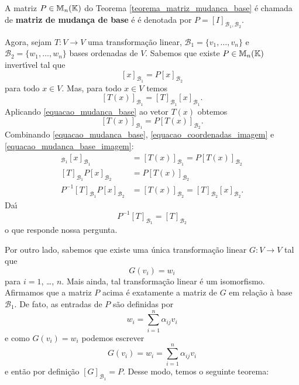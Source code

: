 \begin{definicao}
	A matriz $P \in \mathbb{M}_n(\mathbb{K})$ do Teorema \ref{teorema_matriz_mudanca_base} \'e chamada de \textbf{matriz de mudan\c{c}a de base} \'e \'e denotada por $P = [I]_{{\mathcal{B}_1},{\mathcal{B}_2}}$.
\end{definicao}

Agora, sejam $T : V \to V$ uma transforma\c{c}\~ao linear, $\mathcal{B}_1 = \{v_1,\dots,v_n\}$ e $\mathcal{B}_2 = \{w_1,\dots,w_n\}$ bases ordenadas de $V$. Sabemos que existe $P \in \mathbb{M}_n(\mathbb{K})$ invert{\'\i}vel tal que
\begin{equation}\label{equacao_mudanca_base}
	[x]_{\mathcal{B}_1} = P[x]_{\mathcal{B}_2}
\end{equation}
para todo $x \in V$. Mas, para todo $x \in V$ temos
\begin{equation}\label{equacao_coordenadas_imagem}
	[T(x)]_{\mathcal{B}_1} = [T]_{\mathcal{B}_1}[x]_{\mathcal{B}_1}.
\end{equation}
Aplicando \eqref{equacao_mudanca_base} ao vetor $T(x)$ obtemos
\begin{equation}\label{equacao_mudanca_base_imagem}
	[T(x)]_{\mathcal{B}_1} = P[T(x)]_{\mathcal{B}_2}.
\end{equation}
Combinando \eqref{equacao_mudanca_base}, \eqref{equacao_coordenadas_imagem} e \eqref{equacao_mudanca_base_imagem}:
\begin{align*}
	[T]_{\mathcal{B}_1}[x]_{\mathcal{B}_1} &= [T(x)]_{\mathcal{B}_1} = P[T(x)]_{\mathcal{B}_2}\\
	[T]_{\mathcal{B}_1}P[x]_{\mathcal{B}_2} &= P[T(x)]_{\mathcal{B}_2}\\
	P^{-1}[T]_{\mathcal{B}_1}P[x]_{\mathcal{B}_2} &= [T(x)]_{\mathcal{B}_2} = [T]_{\mathcal{B}_2}[x]_{\mathcal{B}_2}.
\end{align*}
Da{\'\i}
\[
	P^{-1}[T]_{\mathcal{B}_1} = [T]_{\mathcal{B}_2}
\]
o que responde nossa pergunta.

Por outro lado, sabemos que existe uma \'unica transforma\c{c}\~ao linear $G : V \to V$ tal que
\[
	G(v_i) = w_i
\]
para $i = 1$, \dots, $n$. Mais ainda, tal transforma\c{c}\~ao linear \'e um isomorfismo. Afirmamos que a matriz $P$ acima \'e exatamente a matriz de $G$ em rela\c{c}\~ao \`a base $\mathcal{B}_1$. De fato, as entradas de $P$ s\~ao definidas por
\[
	w_i = \sum_{i=1}^n\alpha_{ij}v_i
\]
e como $G(v_i) = w_i$ podemos escrever
\[
	G(v_i) = w_i = \sum_{i=1}^n\alpha_{ij}v_i
\]
e ent\~ao por defini\c{c}\~ao $[G]_{\mathcal{B}_1} = P$. Desse modo, temos o seguinte teorema:

